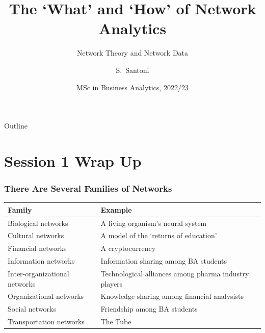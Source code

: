 \documentclass[notes, aspectratio=1610]{beamer}
\title[Network Theory and Network Data]
{The `What' and `How' of Network Analytics}
\subtitle{Network Theory and Network Data}
\author{S.~Santoni\inst{1}\inst{2}}
\institute{
	\inst{1}%
	Bayes Business School
	\and
	\inst{2}%
	Soundcloud
	}
\date{MSc in Business Analytics, 2022/23}
\begin{document}
\begin{frame}
	\titlepage
\end{frame}

\begin{frame}{Outline}
	\tableofcontents
\end{frame}

\section{Session 1 Wrap Up}

\begin{frame}
	\frametitle{There Are Several Families of Networks}
	\begin{table}
		\begin{small}
		\begin{center}
		\begin{tabular}[c]{p{4.5cm}|l}
			\textbf{Family} & 
			\textbf{Example} \\
			\hline 
			\rowcolor{gray!20}
			Biological networks\dotfill
			& A living organism's neural system\\
		        Cultural networks\dotfill
			& A model of the `returns of education'\\
			\rowcolor{gray!20}
			Financial networks\dotfill
			& A cryptocurrency\\
			Information networks\dotfill
			& Information sharing among BA students\\
			\rowcolor{gray!20}
			Inter-organizational networks\dotfill
			& Technological alliances among pharma industry players\\
		        Organizational networks\dotfill
			& Knowledge sharing among financial analysists\\
    			\rowcolor{gray!20}       
			Social networks\dotfill
			& Friendship among BA students\\
		        Transportation networks\dotfill
			& The Tube\\				
		\end{tabular}
		\end{center}
		\end{small}
	\end{table}
\end{frame}
\end{document}
